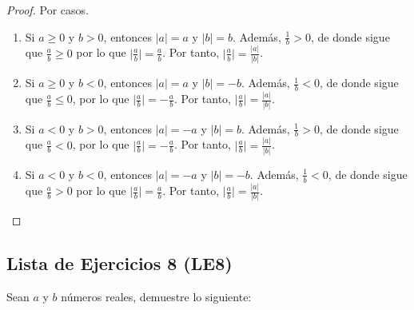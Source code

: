 \documentclass[11pt]{article}
\newcommand{\N}{\mathbb{N}}
\newcommand{\Z}{\mathbb{Z}}
\newcommand{\bfit}[1]{\textbf{\textit{#1}}}
\let\set\Set
\let\union\cup
\begin{document}
\begin{enumerate}[label=\alph*)]
\begin{proof} Por casos.
 \begin{enumerate}[label=\roman*)]
  \item Si $a \geq 0$ y $b>0$, entonces $|a|=a$ y $|b|=b$. Además, $\frac{1}{b} >0$, de donde sigue que $\frac{a}{b} \geq 0$ por lo que $\big| \frac{a}{b} \big| = \frac{a}{b}$. Por tanto, $ \big| \frac{a}{b} \big| = \frac{|a|}{|b|}$.
  \item Si $a \geq 0$ y $b<0$, entonces $|a|=a$ y $|b|=-b$. Además, $\frac{1}{b} <0$, de donde sigue que $\frac{a}{b} \leq 0$, por lo que $\big| \frac{a}{b} \big| =- \frac{a}{b}$. Por tanto, $ \big| \frac{a}{b} \big| = \frac{|a|}{|b|}$.
  \item Si $a<0$ y $b>0$, entonces $|a|=-a$ y $|b|=b$. Además, $\frac{1}{b} >0$, de donde sigue que $\frac{a}{b} < 0$, por lo que $\big| \frac{a}{b} \big| =- \frac{a}{b}$. Por tanto, $ \big| \frac{a}{b} \big| = \frac{|a|}{|b|}$.
  \item Si $a<0$ y $b<0$, entonces $|a|=-a$ y $|b|=-b$. Además, $\frac{1}{b} <0$, de donde sigue que $\frac{a}{b} > 0$ por lo que $\big| \frac{a}{b} \big| = \frac{a}{b}$. Por tanto, $ \big| \frac{a}{b} \big| = \frac{|a|}{|b|}$. \qedhere
 \end{enumerate} 
\end{proof}

\end{enumerate}




\subsection*{Lista de Ejercicios 8 (LE8)}

Sean $a$ y $b$ números reales, demuestre lo siguiente:
\end{document}
